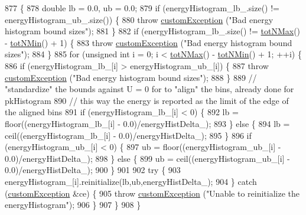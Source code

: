 \begin{DoxyCode}
877                                              \{
878     \textcolor{keywordtype}{double} lb = 0.0, ub = 0.0;
879     \textcolor{keywordflow}{if} (energyHistogram\_lb\_.size() != energyHistogram\_ub\_.size()) \{
880         \textcolor{keywordflow}{throw} \hyperlink{classcustom_exception}{customException} (\textcolor{stringliteral}{"Bad energy histogram bound sizes"});
881     \}
882     \textcolor{keywordflow}{if} (energyHistogram\_lb\_.size() != \hyperlink{classsim_system_aee2c65ecb43a35c0c4d070cdb45f7dc0}{totNMax}() - \hyperlink{classsim_system_af10842e0eaa638373b8717c87b47e6bc}{totNMin}() + 1) \{
883         \textcolor{keywordflow}{throw} \hyperlink{classcustom_exception}{customException} (\textcolor{stringliteral}{"Bad energy histogram bound sizes"});
884     \}
885     \textcolor{keywordflow}{for} (\textcolor{keywordtype}{unsigned} \textcolor{keywordtype}{int} i = 0; i < \hyperlink{classsim_system_aee2c65ecb43a35c0c4d070cdb45f7dc0}{totNMax}() - \hyperlink{classsim_system_af10842e0eaa638373b8717c87b47e6bc}{totNMin}() + 1; ++i) \{
886         \textcolor{keywordflow}{if} (energyHistogram\_lb\_[i] > energyHistogram\_ub\_[i]) \{
887             \textcolor{keywordflow}{throw} \hyperlink{classcustom_exception}{customException} (\textcolor{stringliteral}{"Bad energy histogram bound sizes"});
888         \}
889         \textcolor{comment}{// "standardize" the bounds against U = 0 for to "align" the bins, already done for pkHistogram}
890         \textcolor{comment}{// this way the energy is reported as the limit of the edge of the aligned bins}
891         \textcolor{keywordflow}{if} (energyHistogram\_lb\_[i] < 0) \{
892             lb = floor((energyHistogram\_lb\_[i] - 0.0)/energyHistDelta\_);
893         \} \textcolor{keywordflow}{else} \{
894             lb = ceil((energyHistogram\_lb\_[i] - 0.0)/energyHistDelta\_);
895         \}
896         \textcolor{keywordflow}{if} (energyHistogram\_ub\_[i] < 0) \{
897             ub = floor((energyHistogram\_ub\_[i] - 0.0)/energyHistDelta\_);
898         \} \textcolor{keywordflow}{else} \{
899             ub = ceil((energyHistogram\_ub\_[i] - 0.0)/energyHistDelta\_);
900         \}
901 
902         \textcolor{keywordflow}{try} \{
903             energyHistogram\_[i].reinitialize(lb,ub,energyHistDelta\_);
904         \} \textcolor{keywordflow}{catch} (\hyperlink{classcustom_exception}{customException} &ce) \{
905             \textcolor{keywordflow}{throw} \hyperlink{classcustom_exception}{customException} (\textcolor{stringliteral}{"Unable to reinitialize the energyHistogram"});
906         \}
907     \}
908 \}
\end{DoxyCode}
